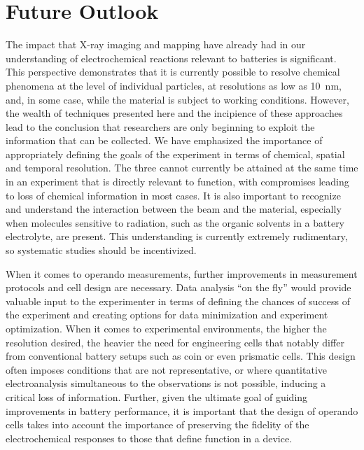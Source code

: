 \documentclass[journal=cmatex,manuscript=perspective]{achemso}
\begin{document}
\section{Future Outlook}

The impact that X-ray imaging and mapping have already had in our
understanding of electrochemical reactions relevant to batteries is
significant. This perspective demonstrates that it is currently
possible to resolve chemical phenomena at the level of individual
particles, at resolutions as low as \SI{10}{nm}, and, in some case,
while the material is subject to working conditions. However, the
wealth of techniques presented here and the incipience of these
approaches lead to the conclusion that researchers are only beginning
to exploit the information that can be collected. We have emphasized
the importance of appropriately defining the goals of the experiment
in terms of chemical, spatial and temporal resolution. The three
cannot currently be attained at the same time in an experiment that is
directly relevant to function, with compromises leading to loss of
chemical information in most cases. It is also important to recognize
and understand the interaction between the beam and the material,
especially when molecules sensitive to radiation, such as the organic
solvents in a battery electrolyte, are present. This understanding is
currently extremely rudimentary, so systematic studies should be
incentivized.

When it comes to operando measurements, further improvements in
measurement protocols and cell design are necessary. Data analysis ``on
the fly'' would provide valuable input to the experimenter in terms of
defining the chances of success of the experiment and creating options
for data minimization and experiment optimization. When it comes to
experimental environments, the higher the resolution desired, the
heavier the need for engineering cells that notably differ from
conventional battery setups such as coin or even prismatic cells. This
design often imposes conditions that are not representative, or where
quantitative electroanalysis simultaneous to the observations is not
possible, inducing a critical loss of information. Further, given the
ultimate goal of guiding improvements in battery performance, it is
important that the design of operando cells takes into account the
importance of preserving the fidelity of the electrochemical responses
to those that define function in a device.
\end{document}
